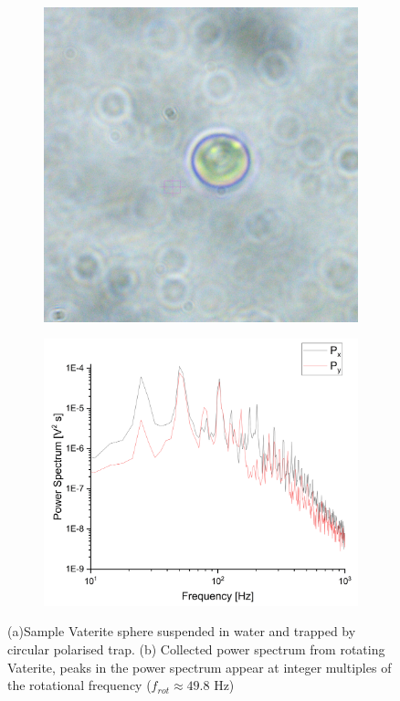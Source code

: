 \begin{figure}[h!]
	\centering
	\begin{subfigure}{0.4\linewidth}
		\includegraphics[width=\linewidth]{vaterite_sample.jpg}
		\subcaption{}
	\end{subfigure}
	\begin{subfigure}{0.55\linewidth}
		\includegraphics[width=\linewidth]{rotating_psd.png}
		\subcaption{}
	\end{subfigure}
	\caption{(a)Sample Vaterite sphere suspended in water and trapped by
		 circular polarised trap. (b) Collected power spectrum from 
		 rotating Vaterite, peaks in the power spectrum appear at integer 
		 multiples of the rotational frequency ($f_{rot} \approx 49.8$ Hz)}
	\label{fig:vaterite}
\end{figure}

